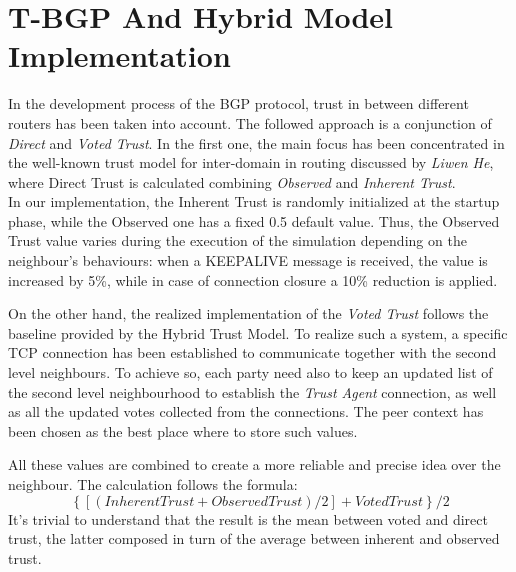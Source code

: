 \section{T-BGP And Hybrid Model Implementation}\label{BGPTrust}
In the development process of the BGP protocol, trust in between different routers has been taken into account. The followed approach is a conjunction of \textit{Direct} and \textit{Voted Trust}. In the first one, the main focus has been concentrated in the well-known trust model for inter-domain in routing\cite{he2006novel} discussed by \textit{Liwen He}, where Direct Trust is calculated combining \textit{Observed} and \textit{Inherent Trust}.\\
In our implementation, the Inherent Trust is randomly initialized at the startup phase, while the Observed one has a fixed 0.5 default value. Thus, the Observed Trust value varies during the execution of the simulation depending on the neighbour's behaviours: when a KEEPALIVE message is received, the value is increased by 5\%, while in case of connection closure a 10\% reduction is applied.

On the other hand, the realized implementation of the \textit{Voted Trust} follows the baseline provided by the Hybrid Trust Model\cite{rantala2011hybrid}. To realize such a system, a specific TCP connection has been established to communicate together with the second level neighbours. To achieve so, each party need also to keep an updated list of the second level neighbourhood to establish the \textit{Trust Agent} connection, as well as all the updated votes collected from the connections. The peer context has been chosen as the best place where to store such values.

All these values are combined to create a more reliable and precise idea over the neighbour. The calculation follows the formula:
$$ \left\{[(Inherent Trust + Observed Trust) / 2 ] + Voted Trust \right\} / 2 $$
It's trivial to understand that the result is the mean between voted and direct trust, the latter composed in turn of the average between inherent and observed trust.

